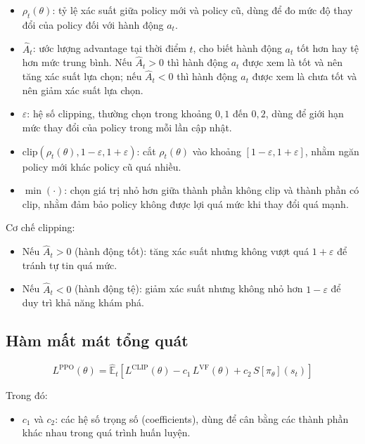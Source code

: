 \begin{itemize}
\begin{itemize}[leftmargin=1.5cm]
    \item $\rho_t(\theta)$: tỷ lệ xác suất giữa policy mới và policy cũ, dùng để đo mức độ
    thay đổi của policy đối với hành động $a_t$.

    \item $\hat{A}_t$: ước lượng advantage tại thời điểm $t$, cho biết hành động $a_t$
    tốt hơn hay tệ hơn mức trung bình. Nếu $\hat{A}_t > 0$ thì hành động $a_t$ được xem
    là tốt và nên tăng xác suất lựa chọn; nếu $\hat{A}_t < 0$ thì hành động $a_t$ được xem
    là chưa tốt và nên giảm xác suất lựa chọn.

    \item $\varepsilon$: hệ số clipping, thường chọn trong khoảng $0{,}1$ đến $0{,}2$,
    dùng để giới hạn mức thay đổi của policy trong mỗi lần cập nhật.

    \item $\text{clip}\left(\rho_t(\theta), 1-\varepsilon, 1+\varepsilon\right)$:
    cắt $\rho_t(\theta)$ vào khoảng $[1-\varepsilon, 1+\varepsilon]$, nhằm ngăn policy mới
    khác policy cũ quá nhiều.

    \item $\min(\cdot)$: chọn giá trị nhỏ hơn giữa thành phần không clip và thành phần
    có clip, nhằm đảm bảo policy không được lợi quá mức khi thay đổi quá mạnh.
\end{itemize}

Cơ chế clipping:
\begin{itemize}
    \item Nếu $\hat{A}_t > 0$ (hành động tốt): tăng xác suất nhưng không vượt
    quá $1 + \varepsilon$ để tránh tự tin quá mức.
    \item Nếu $\hat{A}_t < 0$ (hành động tệ): giảm xác suất nhưng không nhỏ hơn
    $1 - \varepsilon$ để duy trì khả năng khám phá.
\end{itemize}

\subsection{Hàm mất mát tổng quát}

\begin{equation}
    L^{\text{PPO}}(\theta) = \hat{\mathbb{E}}_t\!\left[
        L^{\text{CLIP}}(\theta)
        - c_1\, L^{\text{VF}}(\theta)
        + c_2\, S\!\left[\pi_\theta\right](s_t)
    \right]
    \label{eq:ppo_total_loss}
\end{equation}

Trong đó:
\begin{itemize}[leftmargin=1.5cm]
    \item $c_1$ và $c_2$: các hệ số trọng số (coefficients), dùng để cân bằng
    các thành phần khác nhau trong quá trình huấn luyện.


\end{itemize}
\end{itemize}
